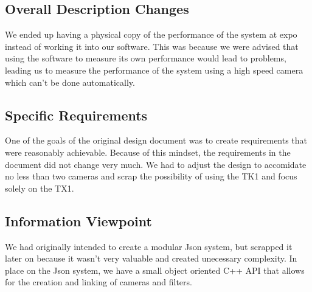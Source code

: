\subsection{Overall Description Changes}
We ended up having a physical copy of the performance of the system at expo instead of working it into our software. This was because we were advised that using the software to measure its own performance would lead to problems, leading us to measure the performance of the system using a high speed camera which can't be done automatically.
\subsection{Specific Requirements}
One of the goals of the original design document was to create requirements that were reasonably achievable. Because of this mindset, the requirements in the document did not change very much. We had to adjust the design to accomidate no less than two cameras and scrap the possibility of using the TK1 and focus solely on the TX1.
\subsection{Information Viewpoint}
We had originally intended to create a modular Json system, but scrapped it later on because it wasn't very valuable and created unecessary complexity. In place on the Json system, we have a small object oriented C++ API that allows for the creation and linking of cameras and filters.

